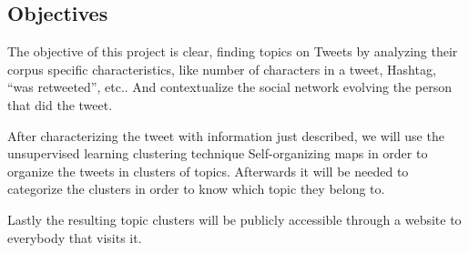 \subsection{Objectives} %
\label{sub:objectives}

The objective of this project is clear, finding topics on Tweets by analyzing their corpus specific characteristics, like number of characters in a tweet, Hashtag, “was retweeted”, etc.. And contextualize the social network evolving the person that did the tweet.

After characterizing the tweet with information just described, we will use the unsupervised learning clustering technique Self-organizing maps in order to organize the tweets in clusters of topics. Afterwards it will be needed to categorize the clusters in order to know which topic they belong to.

Lastly the resulting topic clusters will be publicly accessible through a website to everybody that visits it.
